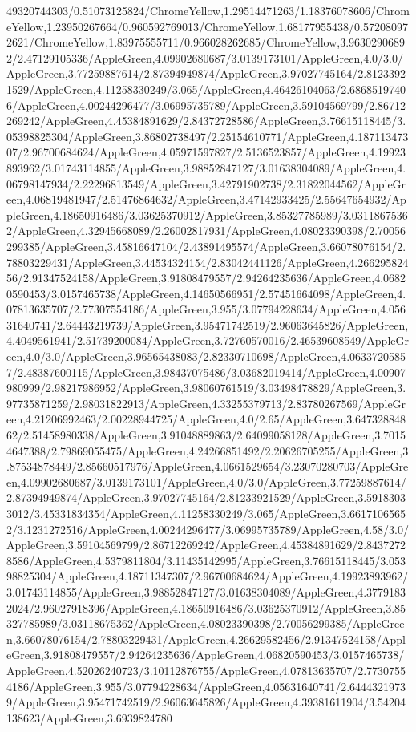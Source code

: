 {\begin{tikzternal}
49320744303/0.51073125824/ChromeYellow,1.29514471263/1.18376078606/ChromeYellow,1.23950267664/0.960592769013/ChromeYellow,1.68177955438/0.572080972621/ChromeYellow,1.83975555711/0.966028262685/ChromeYellow,3.96302906892/2.47129105336/AppleGreen,4.09902680687/3.0139173101/AppleGreen,4.0/3.0/AppleGreen,3.77259887614/2.87394949874/AppleGreen,3.97027745164/2.81233921529/AppleGreen,4.11258330249/3.065/AppleGreen,4.46426104063/2.68685197406/AppleGreen,4.00244296477/3.06995735789/AppleGreen,3.59104569799/2.86712269242/AppleGreen,4.45384891629/2.84372728586/AppleGreen,3.76615118445/3.05398825304/AppleGreen,3.86802738497/2.25154610771/AppleGreen,4.18711347307/2.96700684624/AppleGreen,4.05971597827/2.5136523857/AppleGreen,4.19923893962/3.01743114855/AppleGreen,3.98852847127/3.01638304089/AppleGreen,4.06798147934/2.22296813549/AppleGreen,3.42791902738/2.31822044562/AppleGreen,4.06819481947/2.51476864632/AppleGreen,3.47142933425/2.55647654932/AppleGreen,4.18650916486/3.03625370912/AppleGreen,3.85327785989/3.03118675362/AppleGreen,4.32945668089/2.26002817931/AppleGreen,4.08023390398/2.70056299385/AppleGreen,3.45816647104/2.43891495574/AppleGreen,3.66078076154/2.78803229431/AppleGreen,3.44534324154/2.83042441126/AppleGreen,4.26629582456/2.91347524158/AppleGreen,3.91808479557/2.94264235636/AppleGreen,4.06820590453/3.0157465738/AppleGreen,4.14650566951/2.57451664098/AppleGreen,4.07813635707/2.77307554186/AppleGreen,3.955/3.07794228634/AppleGreen,4.05631640741/2.64443219739/AppleGreen,3.95471742519/2.96063645826/AppleGreen,4.4049561941/2.51739200084/AppleGreen,3.72760570016/2.46539608549/AppleGreen,4.0/3.0/AppleGreen,3.96565438083/2.82330710698/AppleGreen,4.06337205857/2.48387600115/AppleGreen,3.98437075486/3.03682019414/AppleGreen,4.00907980999/2.98217986952/AppleGreen,3.98060761519/3.03498478829/AppleGreen,3.97735871259/2.98031822913/AppleGreen,4.33255379713/2.83780267569/AppleGreen,4.21206992463/2.00228944725/AppleGreen,4.0/2.65/AppleGreen,3.64732884862/2.51458980338/AppleGreen,3.91048889863/2.64099058128/AppleGreen,3.70154647388/2.79869055475/AppleGreen,4.24266851492/2.20626705255/AppleGreen,3.87534878449/2.85660517976/AppleGreen,4.0661529654/3.23070280703/AppleGreen,4.09902680687/3.0139173101/AppleGreen,4.0/3.0/AppleGreen,3.77259887614/2.87394949874/AppleGreen,3.97027745164/2.81233921529/AppleGreen,3.59183033012/3.45331834354/AppleGreen,4.11258330249/3.065/AppleGreen,3.66171065652/3.1231272516/AppleGreen,4.00244296477/3.06995735789/AppleGreen,4.58/3.0/AppleGreen,3.59104569799/2.86712269242/AppleGreen,4.45384891629/2.84372728586/AppleGreen,4.5379811804/3.11435142995/AppleGreen,3.76615118445/3.05398825304/AppleGreen,4.18711347307/2.96700684624/AppleGreen,4.19923893962/3.01743114855/AppleGreen,3.98852847127/3.01638304089/AppleGreen,4.37791832024/2.96027918396/AppleGreen,4.18650916486/3.03625370912/AppleGreen,3.85327785989/3.03118675362/AppleGreen,4.08023390398/2.70056299385/AppleGreen,3.66078076154/2.78803229431/AppleGreen,4.26629582456/2.91347524158/AppleGreen,3.91808479557/2.94264235636/AppleGreen,4.06820590453/3.0157465738/AppleGreen,4.52026240723/3.10112876755/AppleGreen,4.07813635707/2.77307554186/AppleGreen,3.955/3.07794228634/AppleGreen,4.05631640741/2.64443219739/AppleGreen,3.95471742519/2.96063645826/AppleGreen,4.39381611904/3.54204138623/AppleGreen,3.6939824780
\end{tikzternal}}

